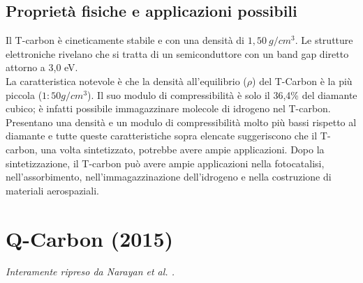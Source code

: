 \documentclass[a4paper,titlepage]{book}
\begin{document}
\section{Proprietà fisiche e applicazioni possibili}
Il T-carbon è cineticamente stabile e con una densità di $1,50 \: g / cm^3$. Le strutture elettroniche rivelano che si tratta di un semiconduttore con un band gap diretto attorno a 3,0 eV.\\ La caratteristica notevole è che la densità all'equilibrio ($\rho$) del T-Carbon è la più piccola ($1:50 g/cm^3$). Il suo modulo di compressibilità è solo il 36,4\% del diamante cubico; è infatti possibile immagazzinare molecole di idrogeno nel T-carbon.\\
Presentano una densità e un modulo di compressibilità  molto più bassi rispetto al diamante e tutte queste caratteristiche sopra elencate suggeriscono che il T-carbon, una volta sintetizzato, potrebbe avere ampie applicazioni.
Dopo la sintetizzazione, il T-carbon può avere ampie applicazioni nella fotocatalisi, nell'assorbimento, nell'immagazzinazione dell'idrogeno e nella costruzione di materiali aerospaziali.\\



\chapter{Q-Carbon (2015)}
\textit{Interamente ripreso da Narayan et al. \cite{QCAR}.}
\end{document}
